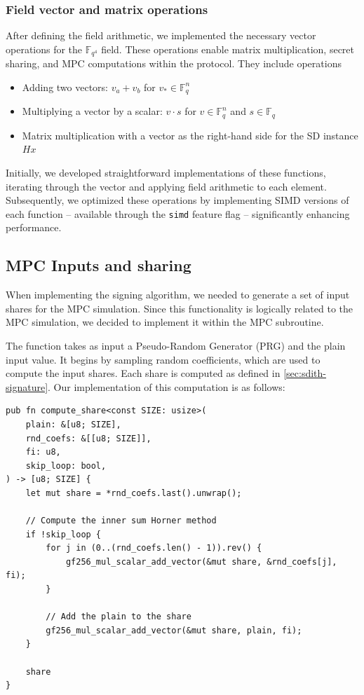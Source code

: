 \documentclass[11pt]{report}
\theoremstyle{definition}
\theoremstyle{plain}
\begin{document}
\subsubsection{Field vector and matrix operations}\label{sub:field_vector_operations}

After defining the field arithmetic, we implemented the necessary vector operations for the $\mathbb{F}_{q^4}$ field. These operations enable matrix multiplication, secret sharing, and MPC computations within the protocol. They include operations

\begin{itemize}
  \item Adding two vectors: $v_a + v_b$ for $v_* \in \mathbb{F}_{q}^n$
  \item Multiplying a vector by a scalar: $v \cdot s$ for $v \in \mathbb{F}_{q}^n$ and $s \in \mathbb{F}_{q}$
  \item Matrix multiplication with a vector as the right-hand side for the SD instance $Hx$
\end{itemize}

Initially, we developed straightforward implementations of these functions, iterating through the vector and applying field arithmetic to each element. Subsequently, we optimized these operations by implementing SIMD versions of each function -- available through the \texttt{simd} feature flag -- significantly enhancing performance.

\subsection{MPC Inputs and sharing}
When implementing the signing algorithm, we needed to generate a set of input shares for the MPC simulation. Since this functionality is logically related to the MPC simulation, we decided to implement it within the MPC subroutine.

The function takes as input a Pseudo-Random Generator (PRG) and the plain input value. It begins by sampling random coefficients, which are used to compute the input shares. Each share is computed as defined in \autoref{sec:sdith-signature}. Our implementation of this computation is as follows:

\begin{verbatim}
pub fn compute_share<const SIZE: usize>(
    plain: &[u8; SIZE],
    rnd_coefs: &[[u8; SIZE]],
    fi: u8,
    skip_loop: bool,
) -> [u8; SIZE] {
    let mut share = *rnd_coefs.last().unwrap();

    // Compute the inner sum Horner method
    if !skip_loop {
        for j in (0..(rnd_coefs.len() - 1)).rev() {
            gf256_mul_scalar_add_vector(&mut share, &rnd_coefs[j], fi);
        }

        // Add the plain to the share
        gf256_mul_scalar_add_vector(&mut share, plain, fi);
    }

    share
}
\end{verbatim}
\end{document}
